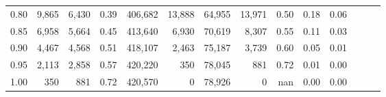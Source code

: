 \begin{tabular}{rrrrrrrrrrrrrr}
0.80 &   9,865 &  6,430 &  0.39 &  406,682 &   13,888 &  64,955 &  13,971 &  0.50 &  0.18 &      0.06 \\
0.85 &   6,958 &  5,664 &  0.45 &  413,640 &    6,930 &  70,619 &   8,307 &  0.55 &  0.11 &      0.03 \\
0.90 &   4,467 &  4,568 &  0.51 &  418,107 &    2,463 &  75,187 &   3,739 &  0.60 &  0.05 &      0.01 \\
0.95 &   2,113 &  2,858 &  0.57 &  420,220 &      350 &  78,045 &     881 &  0.72 &  0.01 &      0.00 \\
1.00 &     350 &    881 &  0.72 &  420,570 &        0 &  78,926 &       0 &   nan &  0.00 &      0.00 \\
\bottomrule
\end{tabular}
